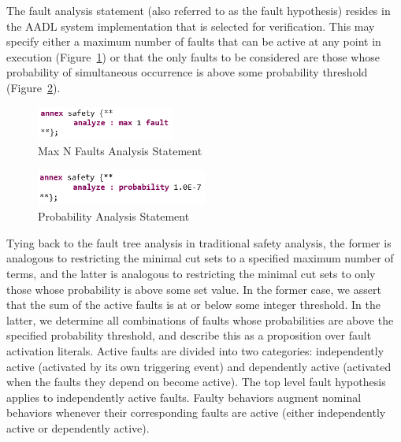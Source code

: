 The fault analysis statement (also referred to as the fault hypothesis) resides in the AADL system implementation that is selected for verification. This may specify either a maximum number of faults that can be active at any point in execution (Figure~\ref{fig:hypothesisMaxN}) or that the only faults to be considered are those whose probability of simultaneous occurrence is above some probability threshold (Figure~\ref{fig:hypothesisProb}).

\begin{figure}[h!]
	\vspace{-0.1in}
	\begin{center}
		\includegraphics[width=0.4\textwidth]{images/hypothesisMaxN.png}
	\end{center}
	\vspace{-0.1in}
	\caption{Max N Faults Analysis Statement}
	\label{fig:hypothesisMaxN}
\end{figure} 

\begin{figure}[h!]
	\vspace{-0.1in}
	\begin{center}
		\includegraphics[width=0.5\textwidth]{images/hypothesisProb.png}
	\end{center}
	\vspace{-0.1in}
	\caption{Probability Analysis Statement}
	\label{fig:hypothesisProb}
\end{figure}

Tying back to the fault tree analysis in traditional safety analysis, the former is analogous to restricting the minimal cut sets to a specified maximum number of terms, and the latter is analogous to restricting the minimal cut sets to only those whose probability is above some set value. In the former case, we assert that the sum of the active faults is at or below some integer threshold.  In the latter, we determine all combinations of faults whose probabilities are above the specified probability threshold, and describe this as a proposition over fault activation literals. 
%
Active faults are divided into two categories: independently active (activated by its own triggering event) and dependently active (activated when the faults they depend on become active). The top level fault hypothesis applies to independently active faults. Faulty behaviors augment nominal behaviors whenever their corresponding faults are active (either independently active or dependently active).

